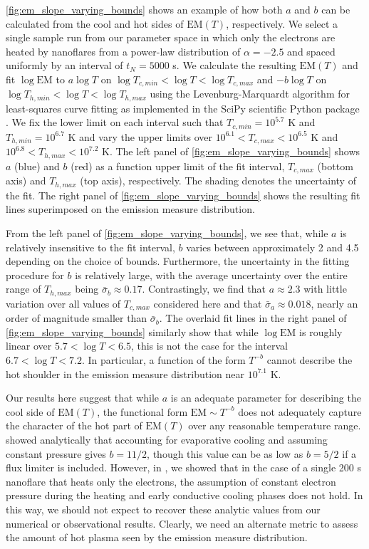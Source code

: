 \documentclass[preprint,linenumbers]{aastex}
\begin{document}
	\par\autoref{fig:em_slope_varying_bounds} shows an example of how both $a$ and $b$ can be calculated from the cool and hot sides of $\mathrm{EM}(T)$, respectively. We select a single sample run from our parameter space in which only the electrons are heated by nanoflares from a power-law distribution of $\alpha=-2.5$ and spaced uniformly by an interval of $t_N=5000$ s. We calculate the resulting $\mathrm{EM}(T)$ and fit $\log{\mathrm{EM}}$ to $a\log{T}$ on $\log{T_{c,min}}<\log{T}<\log{T_{c,max}}$ and $-b\log{T}$ on $\log{T_{h,min}}<\log{T}<\log{T_{h,max}}$ using the Levenburg-Marquardt algorithm for least-squares curve fitting as implemented in the SciPy scientific Python package \citep{van_der_walt_numpy_2011}. We fix the lower limit on each interval such that $T_{c,min}=10^{5.7}$ K and $T_{h,min} = 10^{6.7}$  K and vary the upper limits over $10^{6.1}<T_{c,max}<10^{6.5}$ K and $10^{6.8}<T_{h,max}<10^{7.2}$ K. The left panel of \autoref{fig:em_slope_varying_bounds} shows $a$ (blue) and $b$ (red) as a function upper limit of the fit interval, $T_{c,max}$ (bottom axis) and $T_{h,max}$ (top axis), respectively. The shading denotes the uncertainty of the fit. The right panel of \autoref{fig:em_slope_varying_bounds} shows the resulting fit lines superimposed on the emission measure distribution.
	\par From the left panel of \autoref{fig:em_slope_varying_bounds}, we see that, while $a$ is relatively insensitive to the fit interval, $b$ varies between approximately 2 and 4.5 depending on the choice of bounds. Furthermore, the uncertainty in the fitting procedure for $b$ is relatively large, with the average uncertainty over the entire range of $T_{h,max}$ being $\bar{\sigma}_b\approx0.17$. Contrastingly, we find that $a\approx2.3$ with little variation over all values of $T_{c,max}$ considered here and that $\bar{\sigma}_a\approx0.018$, nearly an order of magnitude smaller than $\bar{\sigma}_b$. The overlaid fit lines in the right panel of \autoref{fig:em_slope_varying_bounds} similarly show that while $\log{\mathrm{EM}}$ is roughly linear over $5.7<\log{T}<6.5$, this is not the case for the interval $6.7<\log{T}<7.2$. In particular, a function of the form $T^{-b}$ cannot describe the hot shoulder in the emission measure distribution near $10^{7.1}$ K.
	\par Our results here suggest that while $a$ is an adequate parameter for describing the cool side of $\mathrm{EM}(T)$, the functional form $\mathrm{EM}\sim T^{-b}$ does not adequately capture the character of the hot part of $\mathrm{EM}(T)$ over any reasonable temperature range. \citep{antiochos_evaporative_1978} showed analytically that accounting for evaporative cooling and assuming constant pressure gives $b=11/2$, though this value can be as low as $b=5/2$ if a flux limiter is included. However, in , we showed that in the case of a single 200 s nanoflare that heats only the electrons, the assumption of constant electron pressure during the heating and early conductive cooling phases does not hold. In this way, we should not expect to recover these analytic values from our numerical or observational results. Clearly, we need an alternate metric to assess the amount of hot plasma seen by the emission measure distribution.
\end{document}
